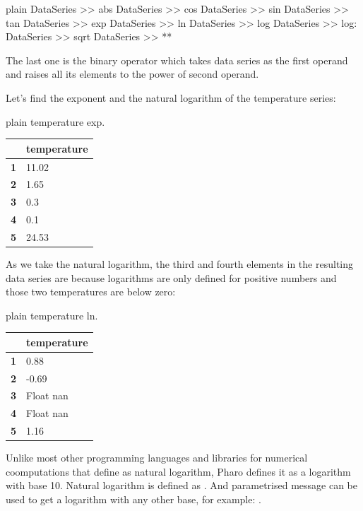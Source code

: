 \documentclass[10pt,twoside,english]{_support/latex/sbabook/sbabook}
\begin{document}
\begin{displaycode}{plain}
DataSeries >> abs
DataSeries >> cos
DataSeries >> sin
DataSeries >> tan
DataSeries >> exp
DataSeries >> ln
DataSeries >> log
DataSeries >> log:
DataSeries >> sqrt
DataSeries >> **
\end{displaycode}

The last one is the binary operator which takes data series as the first operand and raises all its elements to the power of second operand.

Let's find the exponent and the natural logarithm of the temperature series:

\begin{displaycode}{plain}
temperature exp.
\end{displaycode}

\begin{tabular}{ll}
\toprule
 & \textbf{temperature} \\
\midrule
\textbf{1} & 11.02 \\
\textbf{2} & 1.65 \\
\textbf{3} & 0.3 \\
\textbf{4} & 0.1 \\
\textbf{5} & 24.53 \\
\bottomrule
\end{tabular}

As we take the natural logarithm, the third and fourth elements in the resulting data series are  because logarithms are only defined for positive numbers and those two temperatures are below zero:

\begin{displaycode}{plain}
temperature ln.
\end{displaycode}

\begin{tabular}{ll}
\toprule
 & \textbf{temperature} \\
\midrule
\textbf{1} & 0.88 \\
\textbf{2} & -0.69 \\
\textbf{3} & Float nan \\
\textbf{4} & Float nan \\
\textbf{5} & 1.16 \\
\bottomrule
\end{tabular}

\begin{note}
Unlike most other programming languages and libraries for numerical coomputations that define  as natural logarithm, Pharo defines it as a logarithm with base 10. Natural logarithm is defined as . And parametrised message  can be used to get a logarithm with any other base, for example: .
\end{note}
\end{document}
